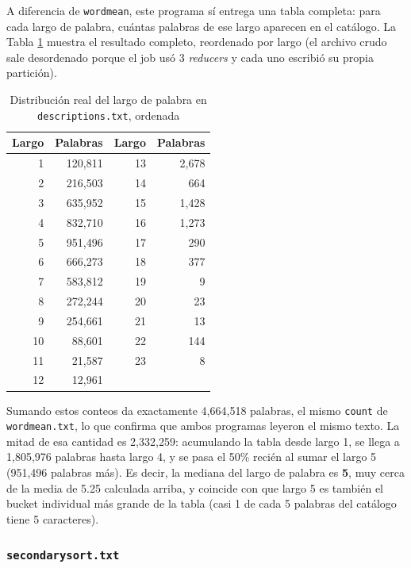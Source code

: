 A diferencia de \texttt{wordmean}, este programa sí entrega una tabla completa: para cada largo de palabra, cuántas palabras de ese largo aparecen en el catálogo. La Tabla \ref{tab:wordmedian} muestra el resultado completo, reordenado por largo (el archivo crudo sale desordenado porque el job usó 3 \emph{reducers} y cada uno escribió su propia partición).

\begin{table}[H]
\centering
\begin{tabular}{rrrr}
\toprule
\textbf{Largo} & \textbf{Palabras} & \textbf{Largo} & \textbf{Palabras} \\
\midrule
1 & 120{,}811 & 13 & 2{,}678 \\
2 & 216{,}503 & 14 & 664 \\
3 & 635{,}952 & 15 & 1{,}428 \\
4 & 832{,}710 & 16 & 1{,}273 \\
5 & 951{,}496 & 17 & 290 \\
6 & 666{,}273 & 18 & 377 \\
7 & 583{,}812 & 19 & 9 \\
8 & 272{,}244 & 20 & 23 \\
9 & 254{,}661 & 21 & 13 \\
10 & 88{,}601 & 22 & 144 \\
11 & 21{,}587 & 23 & 8 \\
12 & 12{,}961 & & \\
\bottomrule
\end{tabular}
\caption{Distribución real del largo de palabra en \texttt{descriptions.txt}, ordenada}
\label{tab:wordmedian}
\end{table}

Sumando estos conteos da exactamente 4{,}664{,}518 palabras, el mismo \texttt{count} de \texttt{wordmean.txt}, lo que confirma que ambos programas leyeron el mismo texto. La mitad de esa cantidad es 2{,}332{,}259: acumulando la tabla desde largo 1, se llega a 1{,}805{,}976 palabras hasta largo 4, y se pasa el 50\% recién al sumar el largo 5 (951{,}496 palabras más). Es decir, la mediana del largo de palabra es \textbf{5}, muy cerca de la media de 5.25 calculada arriba, y coincide con que largo 5 es también el bucket individual más grande de la tabla (casi 1 de cada 5 palabras del catálogo tiene 5 caracteres).

\subsubsection*{\texttt{secondarysort.txt}}

